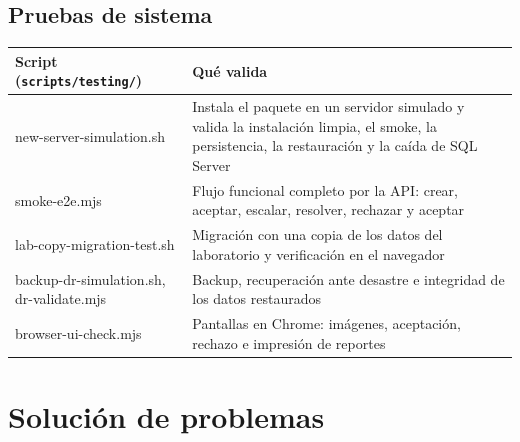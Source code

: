 \documentclass[11pt,a4paper,oneside]{report}
\newcommand{\codus}{\textunderscore\allowbreak}
\DeclareRobustCommand{\cod}[1]{{\small\ttfamily\let\_\codus #1}}
\DeclareRobustCommand{\ruta}[1]{{\small\nolinkurl{#1}}}
\newcommand{\cabecera}{\rowcolor{utaRojo!12}}
\begin{document}
\section{Pruebas de sistema}
\begin{longtable}{@{}P{5.6cm}p{9.0cm}@{}}
\toprule
\cabecera \textbf{Script} (\ruta{scripts/testing/}) & \textbf{Qué valida} \\
\midrule
\endhead
\cod{new-server-simulation.sh} & Instala el paquete en un servidor simulado y valida la instalación limpia, el smoke, la persistencia, la restauración y la caída de SQL Server \\
\cod{smoke-e2e.mjs} & Flujo funcional completo por la API: crear, aceptar, escalar, resolver, rechazar y aceptar \\
\cod{lab-copy-migration-test.sh} & Migración con una copia de los datos del laboratorio y verificación en el navegador \\
\cod{backup-dr-simulation.sh}, \cod{dr-validate.mjs} & Backup, recuperación ante desastre e integridad de los datos restaurados \\
\cod{browser-ui-check.mjs} & Pantallas en Chrome: imágenes, aceptación, rechazo e impresión de reportes \\
\bottomrule
\end{longtable}

\chapter{Solución de problemas}\label{cap:problemas}
\end{document}
